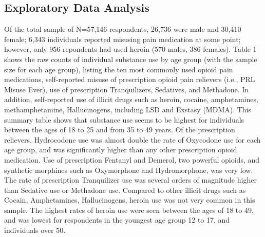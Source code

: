 \documentclass[sigconf]{acmart}
\begin{document}
\subsection{Exploratory Data Analysis \cite{mckinney17}}

Of the total sample of N=57,146 respondents, 26,736 were male and 30,410 
female; 6,343 individuals reported misusing pain medication at some point; 
however, only 956 repondents had used heroin (570 males, 386 females). Table 1 
shows the raw counts of individual substance use by age group (with the sample 
size for each age group), listing the ten most commonly used opioid pain 
medications, self-reported misuse of prescription opioid pain relievers (i.e., 
PRL Misuse Ever), use of prescription Tranquilizers, Sedatives, and Methadone. 
In addition, self-reported use of illicit drugs such as heroin, cocaine, 
amphetamines, methamphetamine, Hallucinogens, including LSD and Exstasy 
(MDMA). This summary table shows that substance use seems to be highest for 
individuals between the ages of 18 to 25 and from 35 to 49 years. Of the
prescription relievers, Hydrocodone use was almost double the rate of 
Oxycodone use for each age group, and was significantly higher than any other 
prescription opioid medication. Use of prescription Fentanyl and Demerol,
two powerful opioids, and synthetic morphines such as Oxymorphone and
Hydromorphone, was very low. The rate of prescription Tranquilizer use
was several orders of magnitude higher than Sedative use or Methadone use.
Compared to other illicit drugs such as Cocain, Amphetamines, Hallucinogens,
heroin use was not very common in this sample. The highest rates of heroin
use were seen between the ages of 18 to 49, and was lowest for respondents
in the youngest age group 12 to 17, and individuals over 50. 
\end{document}
